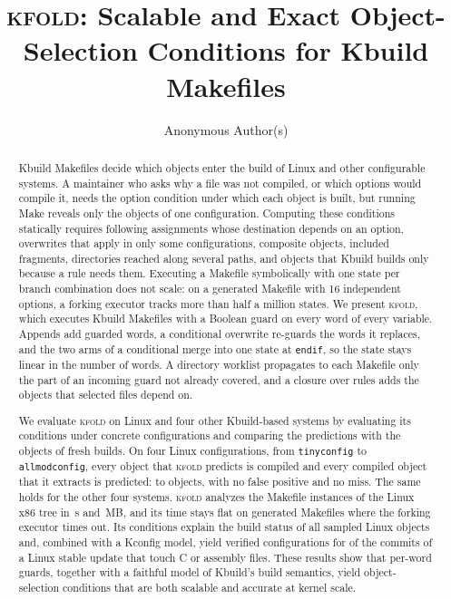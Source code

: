 \documentclass[acmsmall,screen,review]{acmart}
\newcommand{\tool}{\textsc{kfold}\xspace}
\begin{document}
\title{\tool: Scalable and Exact Object-Selection Conditions for Kbuild Makefiles}

\author{Anonymous Author(s)}

\begin{abstract}
Kbuild Makefiles decide which objects enter the build of Linux and other configurable systems. A maintainer who asks why a file was not compiled, or which options would compile it, needs the option condition under which each object is built, but running Make reveals only the objects of one configuration. Computing these conditions statically requires following assignments whose destination depends on an option, overwrites that apply in only some configurations, composite objects, included fragments, directories reached along several paths, and objects that Kbuild builds only because a rule needs them. Executing a Makefile symbolically with one state per branch combination does not scale: on a generated Makefile with 16 independent options, a forking executor tracks more than half a million states. We present \tool, which executes Kbuild Makefiles with a Boolean guard on every word of every variable. Appends add guarded words, a conditional overwrite re-guards the words it replaces, and the two arms of a conditional merge into one state at \texttt{endif}, so the state stays linear in the number of words. A directory worklist propagates to each Makefile only the part of an incoming guard not already covered, and a closure over rules adds the objects that selected files depend on.

We evaluate \tool on Linux \NLinuxVersion and four other Kbuild-based systems by evaluating its conditions under concrete configurations and comparing the predictions with the objects of fresh builds. On four Linux configurations, from \texttt{tinyconfig} to \texttt{allmodconfig}, every object that \tool predicts is compiled and every compiled object that it extracts is predicted: \NLinuxTinyconfigTp to \NLinuxAllmodconfigTp objects, with no false positive and no miss. The same holds for the other four systems. \tool analyzes the \NLinuxInstances Makefile instances of the Linux x86 tree in \NLinuxSeconds\,s and \NLinuxRss\,MB, and its time stays flat on generated Makefiles where the forking executor times out. Its conditions explain the build status of all \NWhyCases sampled Linux objects and, combined with a Kconfig model, yield verified configurations for \NConfigforSelectable of the \NConfigforCommits commits of a Linux stable update that touch C or assembly files. These results show that per-word guards, together with a faithful model of Kbuild's build semantics, yield object-selection conditions that are both scalable and accurate at kernel scale.
\end{abstract}
\end{document}
